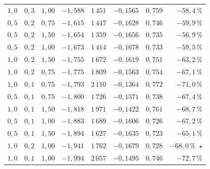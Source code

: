 \begin{table}[htbp]
\begin{tabular}{r r r r r r r r}
$1{,}0$ & $0{,}3$ & $1{,}00$ & $-1{,}588$ & $1\,451$ & $-0{,}1565$ & $0{,}759$ & $-58{,}4$\,\% \\
$0{,}5$ & $0{,}2$ & $0{,}75$ & $-1{,}615$ & $1\,447$ & $-0{,}1628$ & $0{,}746$ & $-59{,}9$\,\% \\
$0{,}5$ & $0{,}2$ & $1{,}50$ & $-1{,}654$ & $1\,359$ & $-0{,}1656$ & $0{,}735$ & $-56{,}9$\,\% \\
$0{,}5$ & $0{,}2$ & $1{,}00$ & $-1{,}673$ & $1\,414$ & $-0{,}1678$ & $0{,}733$ & $-59{,}5$\,\% \\
$1{,}0$ & $0{,}2$ & $1{,}50$ & $-1{,}755$ & $1\,672$ & $-0{,}1619$ & $0{,}751$ & $-63{,}2$\,\% \\
$1{,}0$ & $0{,}2$ & $0{,}75$ & $-1{,}775$ & $1\,809$ & $-0{,}1563$ & $0{,}754$ & $-67{,}1$\,\% \\
$1{,}0$ & $0{,}1$ & $0{,}75$ & $-1{,}793$ & $2\,110$ & $-0{,}1364$ & $0{,}772$ & $-71{,}0$\,\% \\
$0{,}5$ & $0{,}1$ & $0{,}75$ & $-1{,}800$ & $1\,726$ & $-0{,}1571$ & $0{,}738$ & $-67{,}4$\,\% \\
$1{,}0$ & $0{,}1$ & $1{,}50$ & $-1{,}818$ & $1\,971$ & $-0{,}1422$ & $0{,}761$ & $-68{,}7$\,\% \\
$0{,}5$ & $0{,}1$ & $1{,}00$ & $-1{,}883$ & $1\,689$ & $-0{,}1606$ & $0{,}726$ & $-67{,}2$\,\% \\
$0{,}5$ & $0{,}1$ & $1{,}50$ & $-1{,}894$ & $1\,627$ & $-0{,}1635$ & $0{,}723$ & $-65{,}1$\,\% \\
$1{,}0$ & $0{,}2$ & $1{,}00$ & $-1{,}941$ & $1\,762$ & $-0{,}1679$ & $0{,}728$ & $-68{,}0$\,\%~$\star$ \\
$1{,}0$ & $0{,}1$ & $1{,}00$ & $-1{,}994$ & $2\,057$ & $-0{,}1495$ & $0{,}746$ & $-72{,}7$\,\% \\
\bottomrule
\end{tabular}
\end{table}
